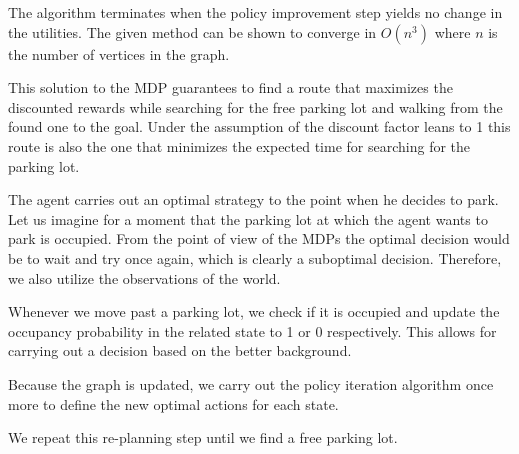 The algorithm terminates when the policy improvement step yields no change in
the utilities. The given method can be shown to converge in $O(n^3)$ where $n$
is the number of vertices in the graph.

This solution to the MDP guarantees to find a route that maximizes the
discounted rewards while searching for the free parking lot and walking from
the found one to the goal. Under the assumption of the discount factor leans
to 1 this route is also the one that minimizes the expected time for searching
for the parking lot.

The agent carries out an optimal strategy to the point when he decides to
park. Let us imagine for a moment that the parking lot at which the agent
wants to park is occupied. From the point of view of the MDPs the optimal
decision would be to wait and try once again, which is clearly a suboptimal
decision. Therefore, we also utilize the observations of the world.

Whenever we move past a parking lot, we check if it is occupied and update
the occupancy probability in the related state to 1 or 0 respectively.
This allows for carrying out a decision based on the better background.

Because the graph is updated, we carry out the policy iteration algorithm
once more to define the new optimal actions for each state.

We repeat this re-planning step until we find a free parking lot.

